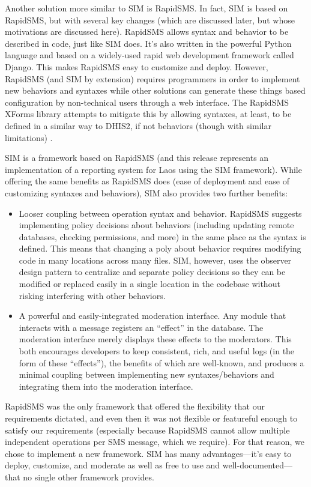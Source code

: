 \documentclass{acm_proc_article-sp}
\begin{document}
Another solution more similar to SIM is RapidSMS. In fact, SIM is based on RapidSMS, but with several key changes (which are discussed later, but whose motivations are discussed here). RapidSMS allows syntax and behavior to be described in code, just like SIM does. It's also written in the powerful Python language and based on a widely-used rapid web development framework called Django. This makes RapidSMS easy to customize and deploy. However, RapidSMS (and SIM by extension) requires programmers in order to implement new behaviors and syntaxes while other solutions can generate these things based configuration by non-technical users through a web interface. The RapidSMS XForms library attempts to mitigate this by allowing syntaxes, at least, to be defined in a similar way to DHIS2, if not behaviors (though with similar limitations) \cite{rapidsms:overview, rapidsms:xforms}.

SIM is a framework based on RapidSMS (and this release represents an implementation of a reporting system for Laos using the SIM framework). While offering the same benefits as RapidSMS does (ease of deployment and ease of customizing syntaxes and behaviors), SIM also provides two further benefits: 

\begin{itemize}
\item Looser coupling between operation syntax and behavior. RapidSMS suggests implementing policy decisions about behaviors (including updating remote databases, checking permissions, and more) in the same place as the syntax is defined. This means that changing a poly about behavior requires modifying code in many locations across many files. SIM, however, uses the observer design pattern to centralize and separate policy decisions so they can be modified or replaced easily in a single location in the codebase without risking interfering with other behaviors.
\item A powerful and easily-integrated moderation interface. Any module that interacts with a message registers an ``effect'' in the database. The moderation interface merely displays these effects to the moderators. This both encourages developers to keep consistent, rich, and useful logs (in the form of these ``effects''), the benefits of which are well-known, and produces a minimal coupling between implementing new syntaxes/behaviors and integrating them into the moderation interface.
\end{itemize}

RapidSMS was the only framework that offered the flexibility that our requirements dictated, and even then it was not flexible or featureful enough to satisfy our requirements (especially because RapidSMS cannot allow multiple independent operations per SMS message, which we require). For that reason, we chose to implement a new framework. SIM has many advantages---it's easy to deploy, customize, and moderate as well as free to use and well-documented---that no single other framework provides.
\end{document}
